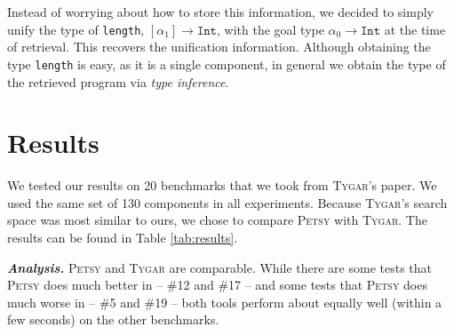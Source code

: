 \documentclass[acmsmall,nonacm]{acmart}
\begin{document}
Instead of worrying about how to store this information,
we decided to simply unify the type of \texttt{length}, $[\alpha_1] \to \texttt{Int}$,
with the goal type $\alpha_0 \to \texttt{Int}$
at the time of retrieval. This recovers the unification information.
Although obtaining the type \texttt{length} is easy, as it is a single component,
in general we obtain the type of the retrieved program via \textit{type inference}.



\section{Results}



We tested our results on 20 benchmarks that we took from \textsc{Tygar}'s \cite{tygar} paper. 
We used the same set of 130 components in all experiments. Because \textsc{Tygar}'s search 
space was most similar to ours, we chose to compare \textsc{Petsy} with \textsc{Tygar}.
The results can be found in Table \ref{tab:results}.



\vspace{2mm}
\noindent \textbf{\textit{Analysis.}} 
\textsc{Petsy} and \textsc{Tygar} are comparable.
While there are some tests that \textsc{Petsy} does much better in -- \#12 and \#17 --
and some tests that \textsc{Petsy} does much worse in -- \#5 and \#19 -- both tools perform
about equally well (within a few seconds) on the other benchmarks.

\end{document}
